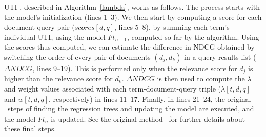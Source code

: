 \documentclass[preprint,review,10pt,3p]{elsarticle}
\begin{document}
UTI \lambdamart, described in Algorithm~\ref{lambda}, works as follows.
The process starts with the model's initialization (lines 1--3). We then start by computing a score for each document-query pair ($scores[d,q]$, lines 5--8), by summing each term's individual UTI, using the model $Ft_{n-1}$, computed so far by the algorithm. 
Using the scores thus computed, we can estimate the difference in NDCG obtained by switching the order of every pair of documents $(d_j,d_k)$ in a query results list ($\Delta NDCG$, lines 9--19). This is performed only when the relevance score for $d_j$ is higher than the relevance score for $d_k$. $\Delta NDCG$ is then used  to compute the $\lambda$ and weight values associated with each term-document-query triple ($\lambda[t,d,q]$ and $w[t,d,q]$, respectively) in lines 11--17.
Finally, in lines 21--24, the original \lambdamart\ steps of finding the regression trees and updating the model are executed, and the model $Ft_n$ is updated. See the original method~\cite{wu2010lambdamart} for further details about these final steps.
 

\end{document}
